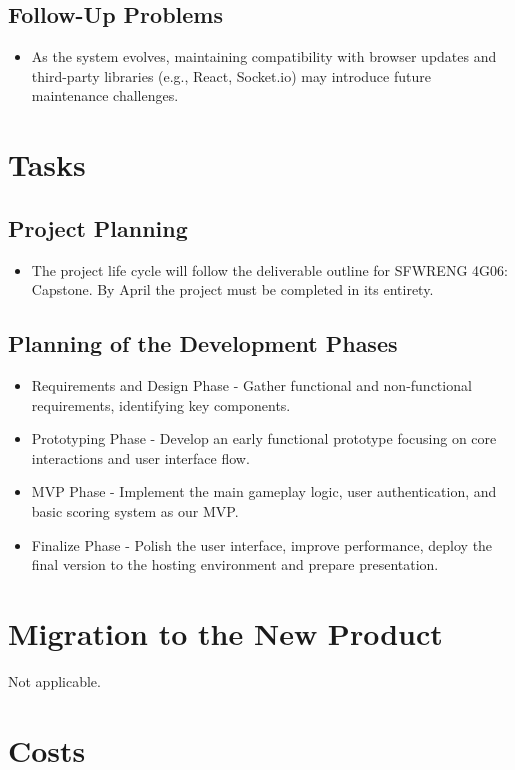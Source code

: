 \documentclass[12pt]{article}
\begin{document}
\subsection{Follow-Up Problems}
\begin{itemize}
	\item As the system evolves, maintaining compatibility with browser updates and third-party libraries (e.g., React, Socket.io) may introduce future maintenance challenges.
\end{itemize}
\section{Tasks}
\subsection{Project Planning}
\begin{itemize}
	\item The project life cycle will follow the deliverable outline for SFWRENG 4G06: Capstone. By April the project must be completed in its entirety.
\end{itemize}
\subsection{Planning of the Development Phases}
\begin{itemize}
	\item Requirements and Design Phase - Gather functional and non-functional requirements, identifying key components.
	\item Prototyping Phase - Develop an early functional prototype focusing on core interactions and user interface flow.
	\item MVP Phase - Implement the main gameplay logic, user authentication, and basic scoring system as our MVP.
	\item Finalize Phase - Polish the user interface, improve performance, deploy the final version to the hosting environment and prepare presentation.
	
\end{itemize}

\section{Migration to the New Product}
Not applicable.

\section{Costs}
\end{document}
